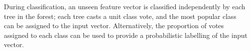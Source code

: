%
During classification, an unseen feature vector is classified independently by each tree in the forest; each tree casts a unit class vote, and the most popular class can be assigned to the input vector. Alternatively, the proportion of votes assigned to each class can be used to provide a probabilistic labelling of the input vector.